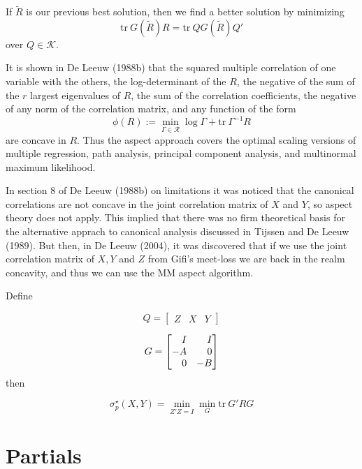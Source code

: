 \documentclass[
  12pt,
]{article}
\begin{document}
If \(\tilde R\) is our previous best solution, then we find a better solution by minimizing
\[
\text{tr}\ G(\tilde R)R=\text{tr}\ QG(\tilde R)Q'
\]
over \(Q\in\mathcal{K}\).

It is shown in De Leeuw (1988b) that the squared multiple correlation of one variable with the others, the log-determinant of the \(R\), the negative of the sum of the \(r\) largest eigenvalues of \(R\), the sum of the correlation coefficients, the negative of any norm of the correlation matrix, and any function of the form
\[
\phi(R):=\min_{\Gamma\in\mathcal{R}}\log\Gamma+\text{tr}\ \Gamma^{-1}R
\]
are concave in \(R\). Thus the aspect approach covers the optimal scaling versions of multiple regression, path analysis, principal component analysis, and multinormal maximum likelihood.

In section 8 of De Leeuw (1988b) on limitations it was noticed that the canonical correlations
are not concave in the joint correlation matrix of \(X\) and \(Y\), so aspect theory does not apply. This implied that there was no firm theoretical basis for the alternative apprach to canonical analysis discussed in
Tijssen and De Leeuw (1989). But then, in De Leeuw (2004), it was discovered that
if we use the joint correlation matrix
of \(X, Y\) and \(Z\) from Gifi's meet-loss we
are back in the realm concavity, and thus we can use the MM aspect algorithm.

Define

\[
Q=\begin{bmatrix}Z&X&Y\end{bmatrix}
\]

\[
G=\begin{bmatrix}\hfill I&\hfill I\\-A&\hfill 0\\\hfill0&-B\end{bmatrix}
\]
then

\[
\sigma_p^\star(X,Y)=\min_{Z'Z=I}\min_{G}\text{tr}\ G'RG
\]

\hypertarget{partials}{%
\section{Partials}\label{partials}}
\end{document}
